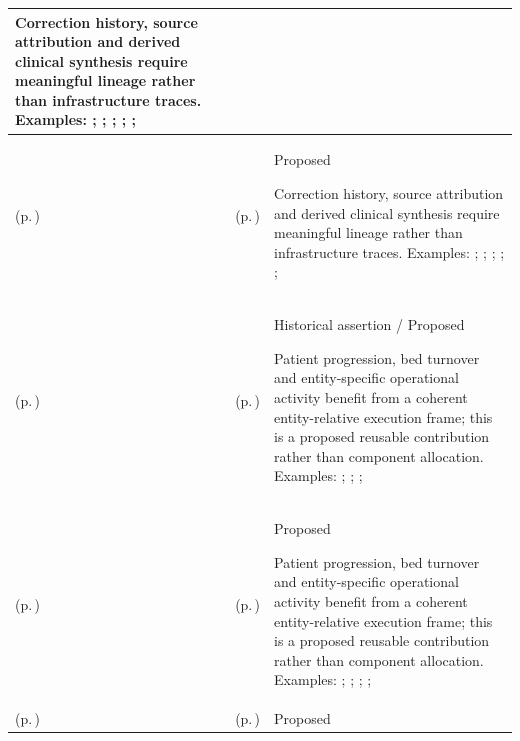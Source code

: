 \begin{longtable}{|>{\raggedright\arraybackslash}p{0.27\TableWidth}|>{\raggedright\arraybackslash}p{0.27\TableWidth}|>{\raggedright\arraybackslash}p{0.46\TableWidth}|}
Correction history, source attribution and derived clinical synthesis require meaningful lineage rather than infrastructure traces. Examples: \nameref{feature:feat-em-01}; \nameref{feature:feat-em-02}; \nameref{feature:feat-em-03}; \nameref{feature:feat-em-04}; \nameref{function:resolve-person-identifier}; \nameref{service:person-identifier-resolution}\\\hline
\nameref{cap:bec-patient-clinical-record} (p.\,\pageref{cap:bec-patient-clinical-record}) & \nameref{cap:ec-information-attribution-lineage} (p.\,\pageref{cap:ec-information-attribution-lineage}) & Proposed

Correction history, source attribution and derived clinical synthesis require meaningful lineage rather than infrastructure traces. Examples: \nameref{feature:feat-ise-01}; \nameref{feature:feat-ise-02}; \nameref{feature:feat-ise-03}; \nameref{function:assemble-longitudinal-clinical-record}; \nameref{service:longitudinal-clinical-record-query}; \nameref{function:maintain-active-clinical-record}\\\hline
\nameref{cap:bec-entity-specific-operational-coordination} (p.\,\pageref{cap:bec-entity-specific-operational-coordination}) & \nameref{cap:ec-entity-relative-operational-progression} (p.\,\pageref{cap:ec-entity-relative-operational-progression}) & Historical assertion / Proposed

Patient progression, bed turnover and entity-specific operational activity benefit from a coherent entity-relative execution frame; this is a proposed reusable contribution rather than component allocation. Examples: \nameref{feature:entity-relative-activity-coordination}; \nameref{feature:entity-behaviour-failure-recovery-governance}; \nameref{function:coordinate-entity-relative-input}; \nameref{service:entity-operational-input-submission}\\\hline
\nameref{cap:bec-discharge-management} (p.\,\pageref{cap:bec-discharge-management}) & \nameref{cap:ec-entity-relative-operational-progression} (p.\,\pageref{cap:ec-entity-relative-operational-progression}) & Proposed

Patient progression, bed turnover and entity-specific operational activity benefit from a coherent entity-relative execution frame; this is a proposed reusable contribution rather than component allocation. Examples: \nameref{feature:feat-hso-27}; \nameref{feature:feat-hso-28}; \nameref{feature:feat-hso-29}; \nameref{function:manage-discharge-coordination-progression}; \nameref{service:discharge-readiness-telemetry}\\\hline
\nameref{cap:bec-bed-care-place-management} (p.\,\pageref{cap:bec-bed-care-place-management}) & \nameref{cap:ec-entity-relative-operational-progression} (p.\,\pageref{cap:ec-entity-relative-operational-progression}) & Proposed


\end{longtable}
